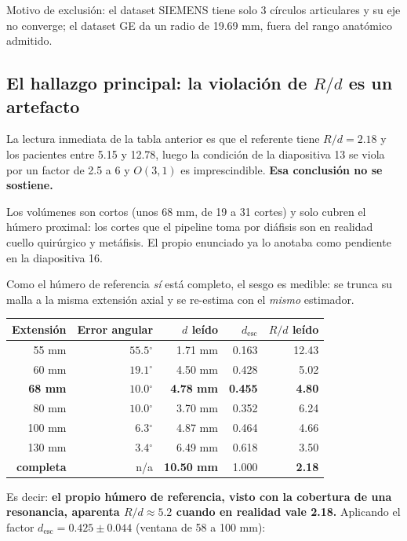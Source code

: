\documentclass[11pt,a4paper]{article}
\providecommand{\degree}{\ensuremath{^\circ}}
\newcommand{\Rd}{\ensuremath{R/d}}
\newcommand{\Ot}{\ensuremath{O(3,1)}}
\begin{document}
\noindent\small
Motivo de exclusión: el dataset SIEMENS tiene solo 3 círculos articulares y su eje no
converge; el dataset GE da un radio de 19.69 mm, fuera del rango anatómico admitido.
\normalsize

\subsection{El hallazgo principal: la violación de \texorpdfstring{\Rd}{R/d} es un artefacto}

La lectura inmediata de la tabla anterior es que el referente tiene $\Rd = 2.18$ y los
pacientes entre 5.15 y 12.78, luego la condición de la diapositiva 13 se viola por un factor
de 2.5 a 6 y \Ot{} es imprescindible. \textbf{Esa conclusión no se sostiene.}

Los volúmenes son cortos (unos 68 mm, de 19 a 31 cortes) y solo cubren el húmero proximal:
los cortes que el pipeline toma por diáfisis son en realidad cuello quirúrgico y metáfisis.
El propio enunciado ya lo anotaba como pendiente en la diapositiva 16.

Como el húmero de referencia \emph{sí} está completo, el sesgo es medible: se trunca su malla
a la misma extensión axial y se re-estima con el \emph{mismo} estimador.

\begin{center}
\begin{tabular}{@{}r r r r r@{}}
\toprule
\textbf{Extensión} & \textbf{Error angular} & \textbf{$d$ leído} &
\textbf{$d_{\text{esc}}$} & \textbf{\Rd{} leído} \\
\midrule
55 mm  & $55.5\degree$ & 1.71 mm  & 0.163 & 12.43 \\
60 mm  & $19.1\degree$ & 4.50 mm  & 0.428 & 5.02 \\
\textbf{68 mm} & $\mathbf{10.0\degree}$ & \textbf{4.78 mm} & \textbf{0.455} & \textbf{4.80} \\
80 mm  & $10.0\degree$ & 3.70 mm  & 0.352 & 6.24 \\
100 mm & $6.3\degree$  & 4.87 mm  & 0.464 & 4.66 \\
130 mm & $3.4\degree$  & 6.49 mm  & 0.618 & 3.50 \\
\midrule
\textbf{completa} & n/a & \textbf{10.50 mm} & 1.000 & \textbf{2.18} \\
\bottomrule
\end{tabular}
\end{center}

Es decir: \textbf{el propio húmero de referencia, visto con la cobertura de una resonancia,
aparenta $\Rd \approx 5.2$ cuando en realidad vale 2.18.} Aplicando el factor
$d_{\text{esc}} = 0.425 \pm 0.044$ (ventana de 58 a 100 mm):
\end{document}
